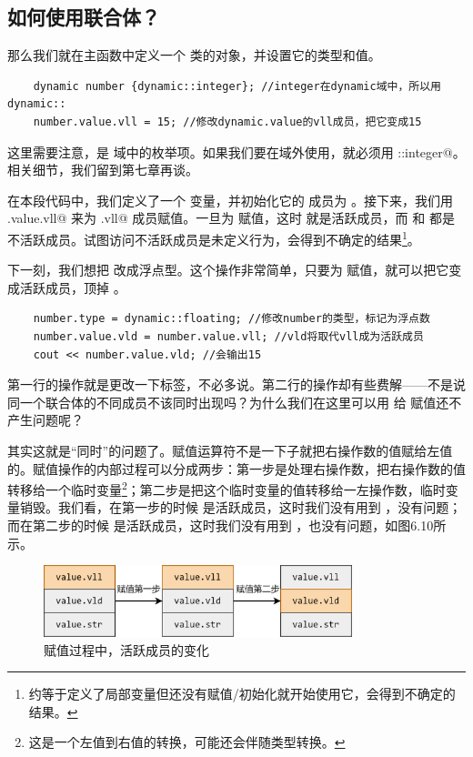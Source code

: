 \subsection*{如何使用联合体？}
那么我们就在主函数中定义一个 \lstinline@dynamic@ 类的对象，并设置它的类型和值。
\begin{lstlisting}
    dynamic number {dynamic::integer}; //integer在dynamic域中，所以用dynamic::
    number.value.vll = 15; //修改dynamic.value的vll成员，把它变成15
\end{lstlisting}
这里需要注意，\lstinline@integer@ 是 \lstinline@dynamic@ 域中的枚举项。如果我们要在域外使用，就必须用 \lstinline@dynamic::integer@。相关细节，我们留到第七章再谈。\par
在本段代码中，我们定义了一个 \lstinline@number@ 变量，并初始化它的 \lstinline@type@ 成员为 \lstinline@integer@。接下来，我们用 \lstinline@number.value.vll@ 来为 \lstinline@value.vll@ 成员赋值。一旦为 \lstinline@vll@ 赋值，这时 \lstinline@vll@ 就是活跃成员，而 \lstinline@vld@ 和 \lstinline@str@ 都是不活跃成员。试图访问不活跃成员是未定义行为，会得到不确定的结果\footnote{约等于定义了局部变量但还没有赋值/初始化就开始使用它，会得到不确定的结果。}。\par
下一刻，我们想把 \lstinline@number@ 改成浮点型。这个操作非常简单，只要为 \lstinline@vld@ 赋值，就可以把它变成活跃成员，顶掉 \lstinline@vll@。\par
\begin{lstlisting}
    number.type = dynamic::floating; //修改number的类型，标记为浮点数
    number.value.vld = number.value.vll; //vld将取代vll成为活跃成员
    cout << number.value.vld; //会输出15
\end{lstlisting}
第一行的操作就是更改一下标签，不必多说。第二行的操作却有些费解——不是说同一个联合体的不同成员不该同时出现吗？为什么我们在这里可以用 \lstinline@vll@ 给 \lstinline@vld@ 赋值还不产生问题呢？\par
其实这就是``同时''的问题了。赋值运算符不是一下子就把右操作数的值赋给左值的。赋值操作的内部过程可以分成两步：第一步是处理右操作数，把右操作数的值转移给一个临时变量\footnote{这是一个左值到右值的转换，可能还会伴随类型转换。}；第二步是把这个临时变量的值转移给一左操作数，临时变量销毁。我们看，在第一步的时候 \lstinline@vll@ 是活跃成员，这时我们没有用到 \lstinline@vld@，没有问题；而在第二步的时候 \lstinline@vld@ 是活跃成员，这时我们没有用到 \lstinline@vll@，也没有问题，如图6.10所示。\par
\begin{figure}[htbp]
    \centering
    \includegraphics[width=0.8\textwidth]{../images/generalized_parts/06_process_of_assignment_to_union.png}
    \caption{赋值过程中，活跃成员的变化}
\end{figure}
